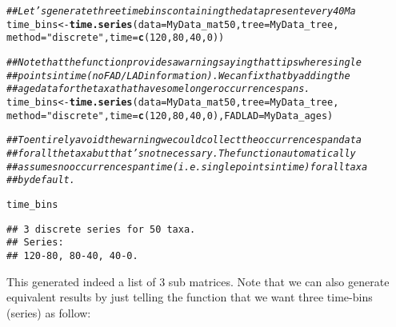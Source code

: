 \documentclass{article}\usepackage[]{graphicx}\usepackage[]{color}
\makeatletter
\newcommand{\hlnum}[1]{\textcolor[rgb]{0.686,0.059,0.569}{#1}}%
\newcommand{\hlstr}[1]{\textcolor[rgb]{0.192,0.494,0.8}{#1}}%
\newcommand{\hlcom}[1]{\textcolor[rgb]{0.678,0.584,0.686}{\textit{#1}}}%
\newcommand{\hlstd}[1]{\textcolor[rgb]{0.345,0.345,0.345}{#1}}%
\newcommand{\hlkwb}[1]{\textcolor[rgb]{0.69,0.353,0.396}{#1}}%
\newcommand{\hlkwc}[1]{\textcolor[rgb]{0.333,0.667,0.333}{#1}}%
\newcommand{\hlkwd}[1]{\textcolor[rgb]{0.737,0.353,0.396}{\textbf{#1}}}%
\newenvironment{kframe}{%
 \def\at@end@of@kframe{}%
 \ifinner\ifhmode%
  \def\at@end@of@kframe{\end{minipage}}%
  \begin{minipage}{\columnwidth}%
 \fi\fi%
 \def\FrameCommand##1{\hskip\@totalleftmargin \hskip-\fboxsep
 \colorbox{shadecolor}{##1}\hskip-\fboxsep
     \hskip-\linewidth \hskip-\@totalleftmargin \hskip\columnwidth}%
 \MakeFramed {\advance\hsize-\width
   \@totalleftmargin\z@ \linewidth\hsize
   \@setminipage}}%
 {\par\unskip\endMakeFramed%
 \at@end@of@kframe}
\newenvironment{knitrout}{}{} %
\makeatother
\begin{document}
\begin{knitrout}
\color{fgcolor}\begin{kframe}
\begin{alltt}
\hlcom{## Let's generate three time bins containing the data present every 40 Ma}
\hlstd{time_bins} \hlkwb{<-} \hlkwd{time.series}\hlstd{(}\hlkwc{data} \hlstd{= MyData_mat50,} \hlkwc{tree} \hlstd{= MyData_tree,}
    \hlkwc{method} \hlstd{=} \hlstr{"discrete"}\hlstd{,} \hlkwc{time} \hlstd{=} \hlkwd{c}\hlstd{(}\hlnum{120}\hlstd{,} \hlnum{80}\hlstd{,} \hlnum{40}\hlstd{,} \hlnum{0}\hlstd{))}
\end{alltt}


{\ttfamily\noindent\itshape\color{messagecolor}{\#\# No FADLAD table has been provided so every tip is assumed to interval single points in time.}}\begin{alltt}
\hlcom{## Note that the function provides a warning saying that tips where single}
\hlcom{## points in time (no FAD/LAD information). We can fix that by adding the}
\hlcom{## age data for the taxa that have some longer occurrence spans.}
\hlstd{time_bins} \hlkwb{<-} \hlkwd{time.series}\hlstd{(}\hlkwc{data} \hlstd{= MyData_mat50,} \hlkwc{tree} \hlstd{= MyData_tree,}
    \hlkwc{method} \hlstd{=} \hlstr{"discrete"}\hlstd{,} \hlkwc{time} \hlstd{=} \hlkwd{c}\hlstd{(}\hlnum{120}\hlstd{,} \hlnum{80}\hlstd{,} \hlnum{40}\hlstd{,} \hlnum{0}\hlstd{),} \hlkwc{FADLAD} \hlstd{= MyData_ages)}
\end{alltt}


{\ttfamily\noindent\itshape\color{messagecolor}{\#\# Some tips have FAD/LAD and are assumed to interval single points in time.}}\begin{alltt}
\hlcom{## To entirely avoid the warning we could collect the occurrence span data}
\hlcom{## for all the taxa but that's not necessary. The function automatically}
\hlcom{## assumes no occurrence span time (i.e. single points in time) for all taxa}
\hlcom{## by default.}

\hlstd{time_bins}
\end{alltt}
\begin{verbatim}
## 3 discrete series for 50 taxa. 
## Series:
## 120-80, 80-40, 40-0.
\end{verbatim}
\end{kframe}
\end{knitrout}

This generated indeed a list of 3 sub matrices.
Note that we can also generate equivalent results by just telling the function that we want three time-bins (series) as follow: 
\end{document}

